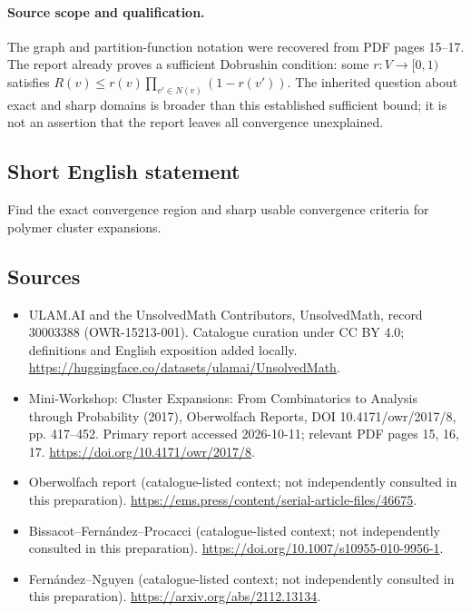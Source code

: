 \documentclass[11pt]{article}
\begin{document}
\paragraph{Source scope and qualification.}
The graph and partition-function notation were recovered from PDF pages 15--17. The report already proves a sufficient Dobrushin condition: some $r:V\to[0,1)$ satisfies $R(v)\leq r(v)\prod_{v'\in N(v)}(1-r(v'))$. The inherited question about exact and sharp domains is broader than this established sufficient bound; it is not an assertion that the report leaves all convergence unexplained.
\subsection{Short English statement}
Find the exact convergence region and sharp usable convergence criteria for polymer cluster expansions.
\subsection{Sources}
\begin{itemize}
\item[\hypertarget{source:30003388:1}{S1}] ULAM.AI and the UnsolvedMath Contributors, UnsolvedMath, record 30003388 (OWR-15213-001). Catalogue curation under CC BY 4.0; definitions and English exposition added locally.
\url{https://huggingface.co/datasets/ulamai/UnsolvedMath}.
\item[\hypertarget{source:30003388:2}{S2}] Mini-Workshop: Cluster Expansions: From Combinatorics to Analysis through Probability (2017), Oberwolfach Reports, DOI 10.4171/owr/2017/8, pp. 417--452. Primary report accessed 2026-10-11; relevant PDF pages 15, 16, 17.
\url{https://doi.org/10.4171/owr/2017/8}.
\item[\hypertarget{source:30003388:3}{S3}] Oberwolfach report (catalogue-listed context; not independently consulted in this preparation).
\url{https://ems.press/content/serial-article-files/46675}.
\item[\hypertarget{source:30003388:4}{S4}] Bissacot--Fernández--Procacci (catalogue-listed context; not independently consulted in this preparation).
\url{https://doi.org/10.1007/s10955-010-9956-1}.
\item[\hypertarget{source:30003388:5}{S5}] Fernández--Nguyen (catalogue-listed context; not independently consulted in this preparation).
\url{https://arxiv.org/abs/2112.13134}.
\end{itemize}
\label{end:30003388}
\end{document}
